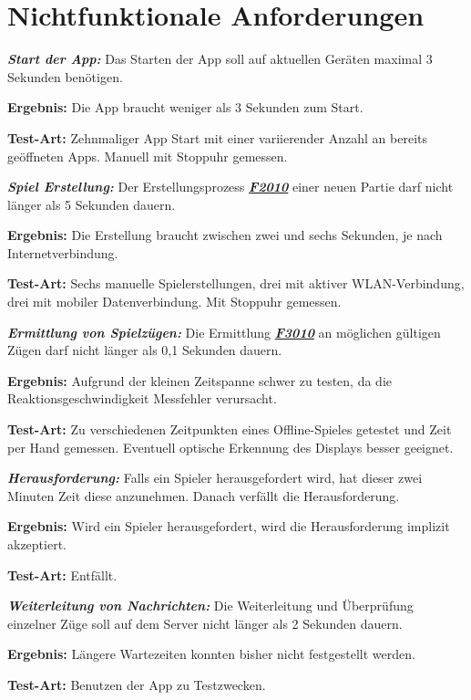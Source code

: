 \documentclass[parskip=full]{scrartcl}
\begin{document}
	\section{Nichtfunktionale Anforderungen}
\begin{description}
	
	\item[NF1010] \textbf{\textit{Start der App: }} Das Starten der App soll auf aktuellen Geräten maximal 3 Sekunden benötigen. 
	\item \textbf{Ergebnis: } Die App braucht weniger als 3 Sekunden zum Start.
	\item \textbf{Test-Art: } Zehnmaliger App Start mit einer variierender Anzahl an bereits geöffneten Apps. Manuell mit Stoppuhr gemessen.
	
	\item[NF1020] \textbf{\textit{Spiel Erstellung: }} Der Erstellungsprozess \hyperlink{F2010}{\textbf{\textit{F2010}}} einer neuen Partie darf nicht länger als 5 Sekunden dauern.
	\item \textbf{Ergebnis: } Die Erstellung braucht zwischen zwei und sechs Sekunden, je nach Internetverbindung.
	\item \textbf{Test-Art: } Sechs manuelle Spielerstellungen, drei mit aktiver WLAN-Verbindung, drei mit mobiler Datenverbindung. Mit Stoppuhr gemessen.
	
	\item[NF1030] \textbf{\textit{Ermittlung von Spielzügen: }} Die Ermittlung \hyperlink{F3010}{\textbf{\textit{F3010}}} an möglichen gültigen Zügen darf nicht länger als 0,1 Sekunden dauern.
	\item \textbf{Ergebnis: } Aufgrund der kleinen Zeitspanne schwer zu testen, da die Reaktionsgeschwindigkeit Messfehler verursacht.
	\item \textbf{Test-Art: } Zu verschiedenen Zeitpunkten eines Offline-Spieles getestet und Zeit per Hand gemessen. Eventuell optische Erkennung des Displays besser geeignet.
	
	\item[NF1040] \textbf{\textit{Herausforderung: }} Falls ein Spieler herausgefordert wird, hat dieser zwei Minuten Zeit diese anzunehmen. Danach verfällt die Herausforderung. 
	\item \textbf{Ergebnis: } Wird ein Spieler herausgefordert, wird die Herausforderung implizit akzeptiert.
	\item \textbf{Test-Art: } Entfällt.
	
	\item[NF1050] \textbf{\textit{Weiterleitung von Nachrichten: }} Die Weiterleitung und Überprüfung einzelner Züge soll auf dem Server nicht länger als 2 Sekunden dauern.
	\item \textbf{Ergebnis: } Längere Wartezeiten konnten bisher nicht festgestellt werden.
	\item \textbf{Test-Art: } Benutzen der App zu Testzwecken.
	

\end{description}
\end{document}
